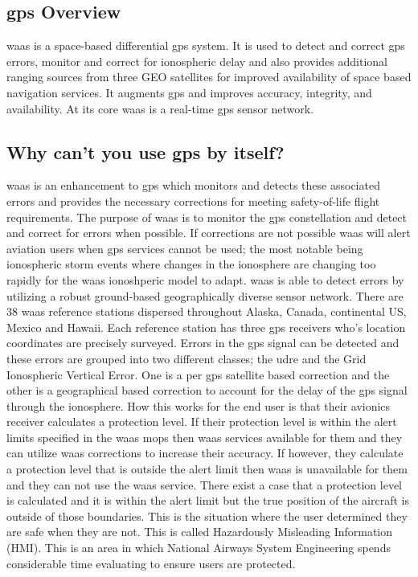 \subsection{\ac{gps} Overview}\label{gps-overview}

\ac{waas} is a space-based differential \ac{gps} system. It is used to detect and correct \ac{gps} errors, monitor and correct for ionospheric delay and also
provides additional ranging sources from three GEO satellites for
improved availability of space based navigation services. It augments
\ac{gps} and improves accuracy, integrity, and availability. At its core \ac{waas} is a real-time \ac{gps} sensor network.


\subsection{Why can't you use \ac{gps} by
itself?}\label{why-cant-you-use-gps-by-itself}

\ac{waas} is an enhancement to \ac{gps} which monitors
and detects these associated errors and provides the necessary
corrections for meeting safety-of-life flight requirements. The purpose
of \ac{waas} is to monitor the \ac{gps} constellation and detect and correct for
errors when possible. If corrections are not possible \ac{waas} will alert
aviation users when \ac{gps} services cannot be used; the most notable being
ionospheric storm events where changes in the ionosphere are changing
too rapidly for the \ac{waas} ionoshperic model to adapt. \ac{waas} is able to
detect errors by utilizing a robust ground-based geographically diverse
sensor network. There are 38 \ac{waas} reference stations dispersed
throughout Alaska, Canada, continental US, Mexico and Hawaii. Each
reference station has three \ac{gps} receivers who's location coordinates are
precisely surveyed. Errors in the \ac{gps} signal can be detected and these
errors are grouped into two different classes; the \ac{udre} and the Grid Ionospheric Vertical Error. One is a per \ac{gps} satellite based correction and the other is a geographical based correction to account for the delay of the \ac{gps} signal through the ionosphere. How this works for the end user is that their avionics receiver calculates a protection level. If their protection level is within the alert limits specified in the \ac{waas} \ac{mops} then \ac{waas} services available for them and they can utilize \ac{waas} corrections to increase their accuracy. If however, they calculate a protection level that is outside the alert limit then \ac{waas} is unavailable for them and
they can not use the \ac{waas} service. There exist a case that a protection
level is calculated and it is within the alert limit but the true
position of the aircraft is outside of those boundaries. This is the
situation where the user determined they are safe when they are not.
This is called Hazardously Misleading Information (HMI). This is an area
in which National Airways System Engineering spends considerable time
evaluating to ensure users are protected.

